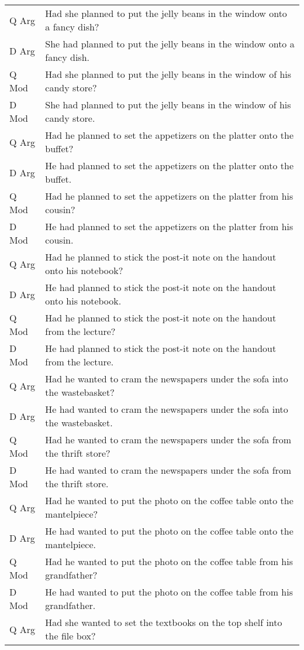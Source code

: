 \documentclass[11pt,oneside]{book}
\begin{document}
\begin{longtable}{ll}
\addlinespace
Q Arg & Had she planned to put the jelly beans in the window onto a fancy dish?\\
D Arg & She had planned to put the jelly beans in the window onto a fancy dish.\\
Q Mod & Had she planned to put the jelly beans in the window of his candy store?\\
D Mod & She had planned to put the jelly beans in the window of his candy store.\\
\addlinespace
Q Arg & Had he planned to set the appetizers on the platter onto the buffet?\\
D Arg & He had planned to set the appetizers on the platter onto the buffet.\\
Q Mod & Had he planned to set the appetizers on the platter from his cousin?\\
D Mod & He had planned to set the appetizers on the platter from his cousin.\\
\addlinespace
Q Arg & Had he planned to stick the post-it note on the handout onto his notebook?\\
D Arg & He had planned to stick the post-it note on the handout onto his notebook.\\
Q Mod & Had he planned to stick the post-it note on the handout from the lecture?\\
D Mod & He had planned to stick the post-it note on the handout from the lecture.\\
\addlinespace
Q Arg & Had he wanted to cram the newspapers under the sofa into the wastebasket?\\
D Arg & He had wanted to cram the newspapers under the sofa into the wastebasket.\\
Q Mod & Had he wanted to cram the newspapers under the sofa from the thrift store?\\
D Mod & He had wanted to cram the newspapers under the sofa from the thrift store.\\
\addlinespace
Q Arg & Had he wanted to put the photo on the coffee table onto the mantelpiece?\\
D Arg & He had wanted to put the photo on the coffee table onto the mantelpiece.\\
Q Mod & Had he wanted to put the photo on the coffee table from his grandfather?\\
D Mod & He had wanted to put the photo on the coffee table from his grandfather.\\
\addlinespace
Q Arg & Had she wanted to set the textbooks on the top shelf into the file box?\\

\end{longtable}
\end{document}
